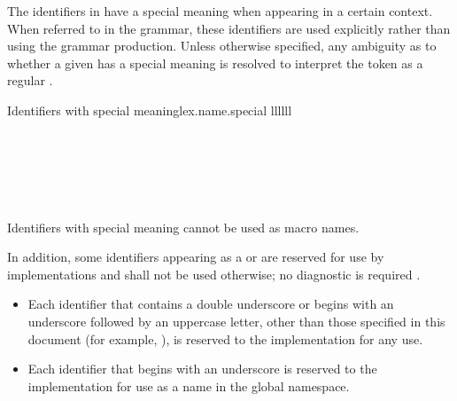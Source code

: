 \pnum
{}%
%
%
%
The identifiers in  have a special meaning when
appearing in a certain context. When referred to in the grammar, these identifiers
are used explicitly rather than using the  grammar production.
Unless otherwise specified, any ambiguity as to whether a given
 has a special meaning is resolved to interpret the
token as a regular .

\begin{multicolfloattable}{Identifiers with special meaning}{lex.name.special}
{llllll}
           \\
\columnbreak
{}          \\
\columnbreak
{}          \\
\columnbreak
{}        \\
\columnbreak
{}            \\
\columnbreak
{}             \\
\end{multicolfloattable}

\pnum
\begin{note}
Identifiers with special meaning
cannot be used as macro names.
\end{note}

\pnum
{}%
%
%
In addition, some identifiers
appearing as a  or 
are reserved for use by \Cpp{}
implementations and shall
not be used otherwise; no diagnostic is required .
\begin{itemize}
\item
Each identifier that contains a double underscore
\tcode{\unun}
%
or begins with an underscore followed by
an uppercase letter,
other than those specified in this document
(for example, ),
%
is reserved to the implementation for any use.
\item
Each identifier that begins with an underscore is
%
reserved to the implementation for use as a name in the global namespace.%
\end{itemize}%

